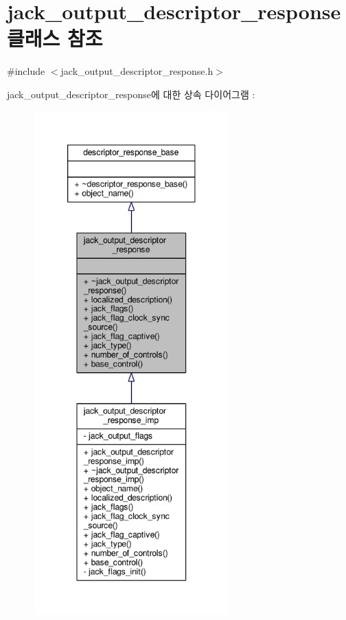 \hypertarget{classavdecc__lib_1_1jack__output__descriptor__response}{}\section{jack\+\_\+output\+\_\+descriptor\+\_\+response 클래스 참조}
\label{classavdecc__lib_1_1jack__output__descriptor__response}


{\ttfamily \#include $<$jack\+\_\+output\+\_\+descriptor\+\_\+response.\+h$>$}



jack\+\_\+output\+\_\+descriptor\+\_\+response에 대한 상속 다이어그램 \+: 
\nopagebreak
\begin{figure}[H]
\begin{center}
\leavevmode
\includegraphics[height=550pt]{classavdecc__lib_1_1jack__output__descriptor__response__inherit__graph}
\end{center}
\end{figure}


